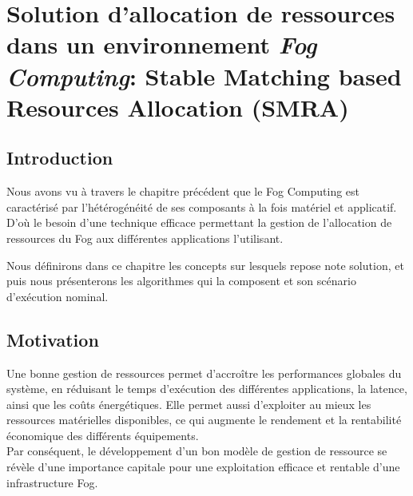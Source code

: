 \chapter{Solution d'allocation de ressources dans un environnement \emph{Fog Computing}: Stable Matching based Resources Allocation (SMRA)}
\thispagestyle{empty}
\newpage
\section{Introduction}
Nous avons vu à travers le chapitre précédent que le Fog Computing est caractérisé par l'hétérogénéité de ses composants à la fois matériel et applicatif. D'où le besoin d'une technique efficace permettant la gestion de l'allocation de ressources du Fog aux différentes applications l'utilisant.\par
Nous définirons dans ce chapitre les concepts sur lesquels repose note solution, et puis nous présenterons les algorithmes qui la composent et son scénario d'exécution nominal.

\section{Motivation}
Une bonne gestion de ressources permet d'accroître les performances globales du système, en réduisant le temps d'exécution des différentes applications, la latence, ainsi que les coûts énergétiques. Elle permet aussi d'exploiter au mieux les ressources matérielles disponibles, ce qui augmente le rendement et la rentabilité économique des différents équipements.\\ 
Par conséquent, le développement d'un bon modèle de gestion de ressource se révèle d'une importance capitale pour une exploitation efficace et rentable d'une infrastructure Fog.


